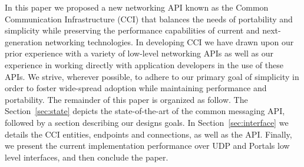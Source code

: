 In this paper we proposed a new networking API known as the Common
Communication Infrastructure (CCI) that balances the needs of
portability and simplicity while preserving the performance
capabilities of current and next-generation networking
technologies. In developing CCI we have drawn upon our prior
experience with a variety of low-level networking APIs as well as our
experience in working directly with application developers in the use
of these APIs. We strive, wherever possible, to adhere to our primary
goal of simplicity in order to foster wide-spread adoption while
maintaining performance and portability. The remainder of this paper
is organized as follow. The Section~\ref{sec:state} depicts the
state-of-the-art of the common messaging API, followed by a section
describing our designs goals. In Section~\ref{sec:interface} we
details the CCI entities, endpoints and connections, as well as the
API. Finally, we present the current implementation performance over
UDP and Portals low level interfaces, and then conclude the paper.


